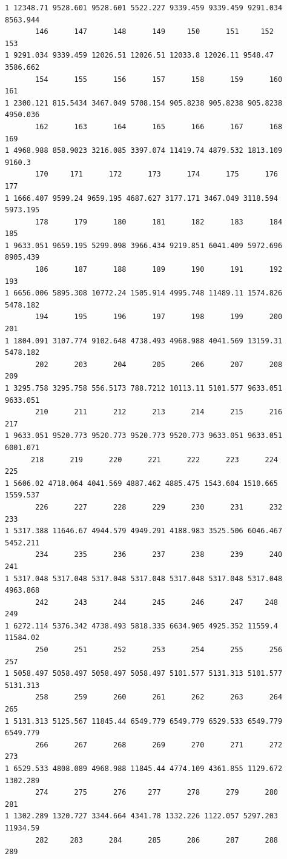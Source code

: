 \documentclass[
  letterpaper,
  DIV=11,
  numbers=noendperiod]{scrreprt}
\begin{document}
\begin{verbatim}
1 12348.71 9528.601 9528.601 5522.227 9339.459 9339.459 9291.034 8563.944
       146      147      148      149     150      151     152      153
1 9291.034 9339.459 12026.51 12026.51 12033.8 12026.11 9548.47 3586.662
       154      155      156      157      158      159      160      161
1 2300.121 815.5434 3467.049 5708.154 905.8238 905.8238 905.8238 4950.036
       162      163      164      165      166      167      168    169
1 4968.988 858.9023 3216.085 3397.074 11419.74 4879.532 1813.109 9160.3
       170     171      172      173      174      175      176      177
1 1666.407 9599.24 9659.195 4687.627 3177.171 3467.049 3118.594 5973.195
       178      179      180      181      182      183      184      185
1 9633.051 9659.195 5299.098 3966.434 9219.851 6041.409 5972.696 8905.439
       186      187      188      189      190      191      192      193
1 6656.006 5895.308 10772.24 1505.914 4995.748 11489.11 1574.826 5478.182
       194      195      196      197      198      199      200      201
1 1804.091 3107.774 9102.648 4738.493 4968.988 4041.569 13159.31 5478.182
       202      203      204      205      206      207      208      209
1 3295.758 3295.758 556.5173 788.7212 10113.11 5101.577 9633.051 9633.051
       210      211      212      213      214      215      216      217
1 9633.051 9520.773 9520.773 9520.773 9520.773 9633.051 9633.051 6001.071
      218      219      220      221      222      223      224      225
1 5606.02 4718.064 4041.569 4887.462 4885.475 1543.604 1510.665 1559.537
       226      227      228      229      230      231      232      233
1 5317.388 11646.67 4944.579 4949.291 4188.983 3525.506 6046.467 5452.211
       234      235      236      237      238      239      240      241
1 5317.048 5317.048 5317.048 5317.048 5317.048 5317.048 5317.048 4963.868
       242      243      244      245      246      247     248      249
1 6272.114 5376.342 4738.493 5818.335 6634.905 4925.352 11559.4 11584.02
       250      251      252      253      254      255      256      257
1 5058.497 5058.497 5058.497 5058.497 5101.577 5131.313 5101.577 5131.313
       258      259      260      261      262      263      264      265
1 5131.313 5125.567 11845.44 6549.779 6549.779 6529.533 6549.779 6549.779
       266      267      268      269      270      271      272      273
1 6529.533 4808.089 4968.988 11845.44 4774.109 4361.855 1129.672 1302.289
       274      275      276     277      278      279      280      281
1 1302.289 1320.727 3344.664 4341.78 1332.226 1122.057 5297.203 11934.59
       282     283      284      285      286      287      288      289

\end{verbatim}
\end{document}
